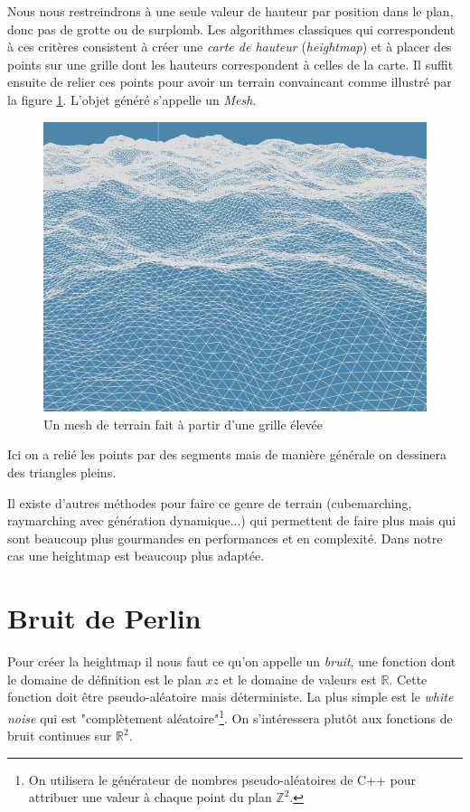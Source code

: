 \documentclass{EPUProjetDi}
\begin{document}
Nous nous restreindrons à une seule valeur de hauteur par position dans le plan, donc pas de grotte ou de surplomb. Les algorithmes classiques qui correspondent à ces critères consistent à créer une \textit{carte de hauteur} (\textit{heightmap}) et à placer des points sur une grille dont les hauteurs correspondent à celles de la carte. Il suffit ensuite de relier ces points pour avoir un terrain convaincant comme illustré par la figure \ref{fig:wireframe_terrain}. L'objet généré s'appelle un \textit{Mesh}.

\begin{figure}[ht]
	\centering
	\includegraphics[scale=.49]{terrain_wireframe}
	\caption{Un mesh de terrain fait à partir d'une grille élevée}
	\label{fig:wireframe_terrain}
\end{figure}

Ici on a relié les points par des segments mais de manière générale on dessinera des triangles pleins.

Il existe d'autres méthodes pour faire ce genre de terrain (cubemarching, raymarching avec génération dynamique...) qui permettent de faire plus mais qui sont beaucoup plus gourmandes en performances et en complexité. Dans notre cas une heightmap est beaucoup plus adaptée.

\section{Bruit de Perlin}

Pour créer la heightmap il nous faut ce qu'on appelle un \textit{bruit}, une fonction dont le domaine de définition est le plan $xz$ et le domaine de valeurs est $\mathbb{R}$. Cette fonction doit être pseudo-aléatoire mais déterministe. La plus simple est le \textit{white noise} qui est "complètement aléatoire"\footnote{On utilisera le générateur de nombres pseudo-aléatoires de C++ pour attribuer une valeur à chaque point du plan $\mathbb{Z}^2$.}. On s'intéressera plutôt aux fonctions de bruit continues sur $\mathbb{R}^2$.
\end{document}
